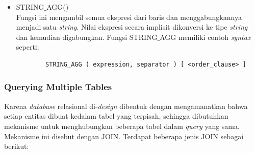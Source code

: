 \begin{itemize}
	\item STRING$\_$AGG()\\
	Fungsi ini mengambil semua ekspresi dari baris dan menggabungkannya menjadi satu \textit{string}. Nilai ekspresi secara implisit dikonversi ke tipe \textit{string} dan kemudian digabungkan. Fungsi STRING$\_$AGG memiliki contoh \textit{syntax} seperti:
	\begin{verbatim}
		STRING_AGG ( expression, separator ) [ <order_clause> ]
	\end{verbatim}
\end{itemize}


\subsubsection{Querying Multiple Tables}
Karena \textit{database} relasional di-\textit{design} dibentuk dengan mengamanatkan bahwa setiap entitas dibuat kedalam tabel yang terpisah, sehingga dibutuhkan mekanisme untuk menghubungkan beberapa tabel dalam \textit{query} yang sama. Mekanisme ini disebut dengan JOIN. Terdapat beberapa jenis JOIN sebagai berikut:
